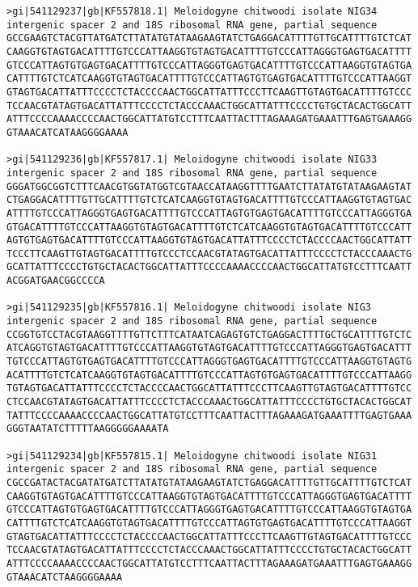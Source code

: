 \documentclass[11pt]{article}
\begin{document}
\begin{Verbatim}[commandchars=\\\{\}]
>gi|541129237|gb|KF557818.1| Meloidogyne chitwoodi isolate NIG34 intergenic spacer 2 and 18S ribosomal RNA gene, partial sequence
GCCGAAGTCTACGTTATGATCTTATATGTATAAGAAGTATCTGAGGACATTTTGTTGCATTTTGTCTCAT
CAAGGTGTAGTGACATTTTGTCCCATTAAGGTGTAGTGACATTTTGTCCCATTAGGGTGAGTGACATTTT
GTCCCATTAGTGTGAGTGACATTTTGTCCCATTAGGGTGAGTGACATTTTGTCCCATTAAGGTGTAGTGA
CATTTTGTCTCATCAAGGTGTAGTGACATTTTGTCCCATTAGTGTGAGTGACATTTTGTCCCATTAAGGT
GTAGTGACATTATTTCCCCTCTACCCCAACTGGCATTATTTCCCTTCAAGTTGTAGTGACATTTTGTCCC
TCCAACGTATAGTGACATTATTTCCCCTCTACCCAAACTGGCATTATTTCCCCTGTGCTACACTGGCATT
ATTTCCCCAAAACCCCAACTGGCATTATGTCCTTTCAATTACTTTAGAAAGATGAAATTTGAGTGAAAGG
GTAAACATCATAAGGGGAAAA

>gi|541129236|gb|KF557817.1| Meloidogyne chitwoodi isolate NIG33 intergenic spacer 2 and 18S ribosomal RNA gene, partial sequence
GGGATGGCGGTCTTTCAACGTGGTATGGTCGTAACCATAAGGTTTTGAATCTTATATGTATAAGAAGTAT
CTGAGGACATTTTGTTGCATTTTGTCTCATCAAGGTGTAGTGACATTTTGTCCCATTAAGGTGTAGTGAC
ATTTTGTCCCATTAGGGTGAGTGACATTTTGTCCCATTAGTGTGAGTGACATTTTGTCCCATTAGGGTGA
GTGACATTTTGTCCCATTAAGGTGTAGTGACATTTTGTCTCATCAAGGTGTAGTGACATTTTGTCCCATT
AGTGTGAGTGACATTTTGTCCCATTAAGGTGTAGTGACATTATTTCCCCTCTACCCCAACTGGCATTATT
TCCCTTCAAGTTGTAGTGACATTTTGTCCCTCCAACGTATAGTGACATTATTTCCCCTCTACCCAAACTG
GCATTATTTCCCCTGTGCTACACTGGCATTATTTCCCCAAAACCCCAACTGGCATTATGTCCTTTCAATT
ACGGATGAACGGCCCCA

>gi|541129235|gb|KF557816.1| Meloidogyne chitwoodi isolate NIG3 intergenic spacer 2 and 18S ribosomal RNA gene, partial sequence
CCGGTGTCCTACGTAAGGTTTTGTTCTTTCATAATCAGAGTGTCTGAGGACTTTTGCTGCATTTTGTCTC
ATCAGGTGTAGTGACATTTTGTCCCATTAAGGTGTAGTGACATTTTGTCCCATTAGGGTGAGTGACATTT
TGTCCCATTAGTGTGAGTGACATTTTGTCCCATTAGGGTGAGTGACATTTTGTCCCATTAAGGTGTAGTG
ACATTTTGTCTCATCAAGGTGTAGTGACATTTTGTCCCATTAGTGTGAGTGACATTTTGTCCCATTAAGG
TGTAGTGACATTATTTCCCCTCTACCCCAACTGGCATTATTTCCCTTCAAGTTGTAGTGACATTTTGTCC
CTCCAACGTATAGTGACATTATTTCCCCTCTACCCAAACTGGCATTATTTCCCCTGTGCTACACTGGCAT
TATTTCCCCAAAACCCCAACTGGCATTATGTCCTTTCAATTACTTTAGAAAGATGAAATTTTGAGTGAAA
GGGTAATATCTTTTTAAGGGGGAAAATA

>gi|541129234|gb|KF557815.1| Meloidogyne chitwoodi isolate NIG31 intergenic spacer 2 and 18S ribosomal RNA gene, partial sequence
CGCCGATACTACGATATGATCTTATATGTATAAGAAGTATCTGAGGACATTTTGTTGCATTTTGTCTCAT
CAAGGTGTAGTGACATTTTGTCCCATTAAGGTGTAGTGACATTTTGTCCCATTAGGGTGAGTGACATTTT
GTCCCATTAGTGTGAGTGACATTTTGTCCCATTAGGGTGAGTGACATTTTGTCCCATTAAGGTGTAGTGA
CATTTTGTCTCATCAAGGTGTAGTGACATTTTGTCCCATTAGTGTGAGTGACATTTTGTCCCATTAAGGT
GTAGTGACATTATTTCCCCTCTACCCCAACTGGCATTATTTCCCTTCAAGTTGTAGTGACATTTTGTCCC
TCCAACGTATAGTGACATTATTTCCCCTCTACCCAAACTGGCATTATTTCCCCTGTGCTACACTGGCATT
ATTTCCCCAAAACCCCAACTGGCATTATGTCCTTTCAATTACTTTAGAAAGATGAAATTTGAGTGAAAGG
GTAAACATCTAAGGGGAAAA


\end{Verbatim}
\end{document}
